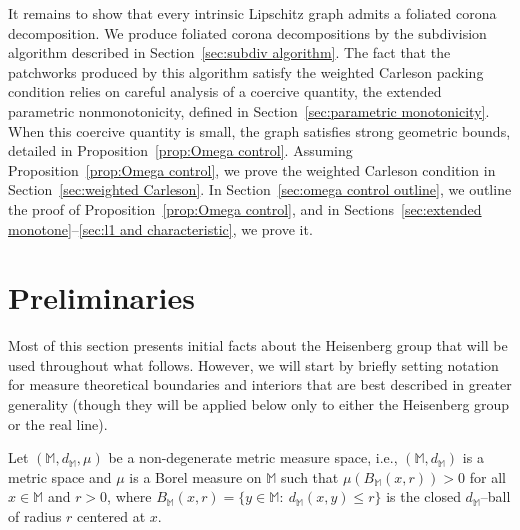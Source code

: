 \documentclass[11pt,reqno]{amsart}
\newcommand{\bbM}{\mathbb{M}}
\newcommand{\0}{\mathbf{0}}
\renewcommand{\1}{\mathbf 1}
\renewcommand{\le}{\leqslant}
\theoremstyle{remark}
\begin{document}
It remains to show that every intrinsic Lipschitz graph admits a foliated corona decomposition.  We produce foliated corona decompositions by the subdivision algorithm described in Section~\ref{sec:subdiv algorithm}.  The fact that the patchworks produced by this algorithm satisfy the weighted Carleson packing condition relies on careful analysis of a coercive quantity, the extended parametric nonmonotonicity, defined in Section~\ref{sec:parametric monotonicity}.  When this coercive quantity is small, the graph satisfies strong geometric bounds, detailed in Proposition~\ref{prop:Omega control}.  Assuming Proposition~\ref{prop:Omega control}, we prove the weighted Carleson condition in Section~\ref{sec:weighted Carleson}.  In Section~\ref{sec:omega control outline}, we outline the proof of Proposition~\ref{prop:Omega control}, and in Sections~\ref{sec:extended monotone}--\ref{sec:l1 and characteristic}, we prove it.

\section{Preliminaries}\label{sec:prem}


Most of this section presents initial facts about the Heisenberg group that will be used throughout what follows. However, we will start by briefly setting  notation for measure theoretical boundaries and interiors that are best described in greater generality (though they will be applied below only to either the Heisenberg group or the real line).

Let $(\bbM,d_\bbM,\mu)$ be  a non-degenerate metric measure space, i.e., $(\bbM,d_\bbM)$ is a metric space and $\mu$ is a Borel measure on $\bbM$ such that $\mu(B_\bbM(x,r))>0$ for all $x\in \bbM$ and $r>0$, where $B_\bbM(x,r)=\{y\in \bbM:\ d_\bbM(x,y)\le r\}$ is the closed $d_\bbM$--ball of radius $r$ centered at $x$.
\end{document}
